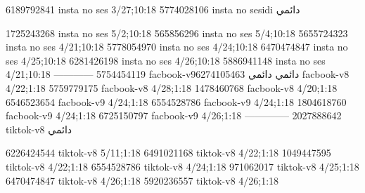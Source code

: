 
6189792841 insta no ses
3/27;10:18
5774028106 insta no sesidi
دائمي


1725243268 insta no ses
5/2;10:18
565856296 insta no ses
5/4;10:18
5655724323 insta no ses
4/21;10:18
5778054970 insta no ses
4/24;10:18
6470474847 insta no ses
4/25;10:18
6281426198 insta no ses
4/26;10:18
5886941148 insta no ses
4/21;10:18
------------
5754454119 facbook-v9دائمي
دائمي
6274105463 facbook-v8
4/22;1:18
5759779175 facbook-v8
4/28;1:18
1478460768 facbook-v8
4/20;1:18
6546523654 facbook-v9
4/24;1:18
6554528786 facbook-v9
4/24;1:18
1804618760 facbook-v9
4/24;1:18
6725150797 facbook-v9
4/26;1:18
--------------
2027888642 tiktok-v8
دائمي

6226424544 tiktok-v8
5/11;1:18
6491021168 tiktok-v8
4/22;1:18
1049447595 tiktok-v8
4/22;1:18
6554528786 tiktok-v8
4/24;1:18
971062017 tiktok-v8
4/25;1:18
6470474847 tiktok-v8
4/26;1:18
5920236557 tiktok-v8
4/26;1:18
